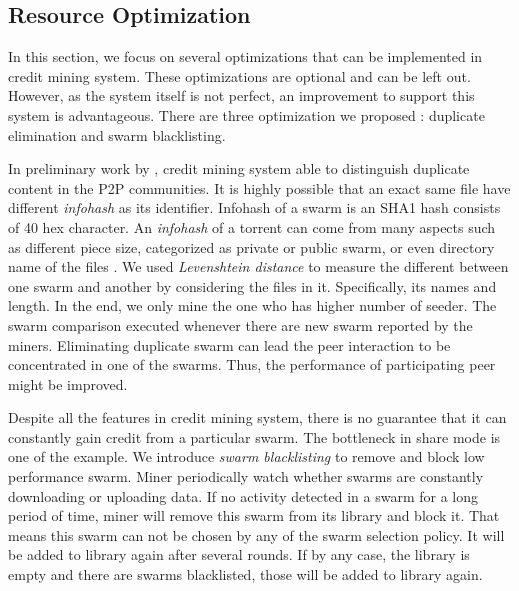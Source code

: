 \subsection{Resource Optimization}
\label{section:optimization}
In this section, we focus on several optimizations that can be implemented in credit mining system. These optimizations are optional and can be left out. However, as the system itself is not perfect, an improvement to support this system is advantageous. There are three optimization we proposed : duplicate elimination and swarm blacklisting.%

In preliminary work by \citeauthor{2015:creditmining:capota}, credit mining system able to distinguish duplicate content in the P2P communities. It is highly possible that an exact same file have different \textit{infohash} as its identifier. Infohash of a swarm is an SHA1 hash consists of 40 hex character. An \textit{infohash} of a torrent can come from many aspects such as different piece size, categorized as private or public swarm, or even directory name of the files \cite{2015:creditmining:capota}. We used \textit{Levenshtein distance} to measure the different between one swarm and another by considering the files in it. Specifically, its names and length. In the end, we only mine the one who has higher number of seeder. The swarm comparison executed whenever there are new swarm reported by the miners. Eliminating duplicate swarm can lead the peer interaction to be concentrated in one of the swarms. Thus, the performance of participating peer might be improved.

Despite all the features in credit mining system, there is no guarantee that it can constantly gain credit from a particular swarm. The bottleneck in share mode is one of the example. We introduce \textit{swarm blacklisting} to remove and block low performance swarm. Miner periodically watch whether swarms are constantly downloading or uploading data. If no activity detected in a swarm for a long period of time, miner will remove this swarm from its library and block it. That means this swarm can not be chosen by any of the swarm selection policy. It will be added to library again after several rounds. If by any case, the library is empty and there are swarms blacklisted, those will be added to library again.

